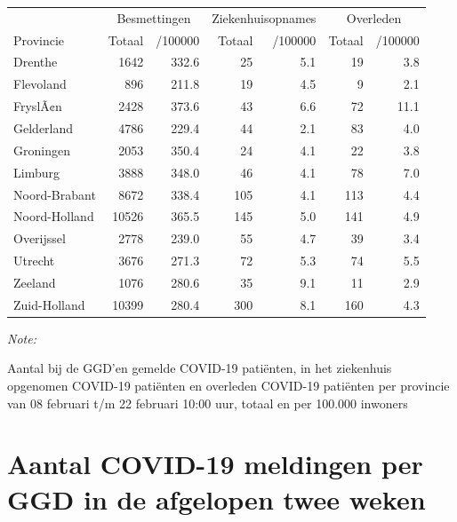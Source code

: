 \documentclass[
  english,
  man,floatsintext]{apa6}
\begin{document}
\begin{table}[H]
\centering
\begin{threeparttable}
\begin{tabular}{lrrrrrr}
\toprule
\multicolumn{1}{c}{ } & \multicolumn{2}{c}{Besmettingen} & \multicolumn{2}{c}{Ziekenhuisopnames} & \multicolumn{2}{c}{Overleden} \\
\cmidrule(l{3pt}r{3pt}){2-3} \cmidrule(l{3pt}r{3pt}){4-5} \cmidrule(l{3pt}r{3pt}){6-7}
Provincie & Totaal & /100000 & Totaal & /100000 & Totaal & /100000\\
\midrule
Drenthe & 1642 & 332.6 & 25 & 5.1 & 19 & 3.8\\
Flevoland & 896 & 211.8 & 19 & 4.5 & 9 & 2.1\\
FryslÃ¢n & 2428 & 373.6 & 43 & 6.6 & 72 & 11.1\\
Gelderland & 4786 & 229.4 & 44 & 2.1 & 83 & 4.0\\
Groningen & 2053 & 350.4 & 24 & 4.1 & 22 & 3.8\\
Limburg & 3888 & 348.0 & 46 & 4.1 & 78 & 7.0\\
Noord-Brabant & 8672 & 338.4 & 105 & 4.1 & 113 & 4.4\\
Noord-Holland & 10526 & 365.5 & 145 & 5.0 & 141 & 4.9\\
Overijssel & 2778 & 239.0 & 55 & 4.7 & 39 & 3.4\\
Utrecht & 3676 & 271.3 & 72 & 5.3 & 74 & 5.5\\
Zeeland & 1076 & 280.6 & 35 & 9.1 & 11 & 2.9\\
Zuid-Holland & 10399 & 280.4 & 300 & 8.1 & 160 & 4.3\\
\bottomrule
\end{tabular}
\begin{tablenotes}
\item \textit{Note: } 
\item Aantal bij de GGD’en gemelde COVID-19 patiënten, in het ziekenhuis opgenomen COVID-19 patiënten en overleden COVID-19 patiënten per provincie van 08 februari t/m 22 februari 10:00 uur, totaal en per 100.000 inwoners
\end{tablenotes}
\end{threeparttable}
\end{table}

\newpage

\hypertarget{aantal-covid-19-meldingen-per-ggd-in-de-afgelopen-twee-weken}{%
\section{Aantal COVID-19 meldingen per GGD in de afgelopen twee weken}\label{aantal-covid-19-meldingen-per-ggd-in-de-afgelopen-twee-weken}}
\end{document}
